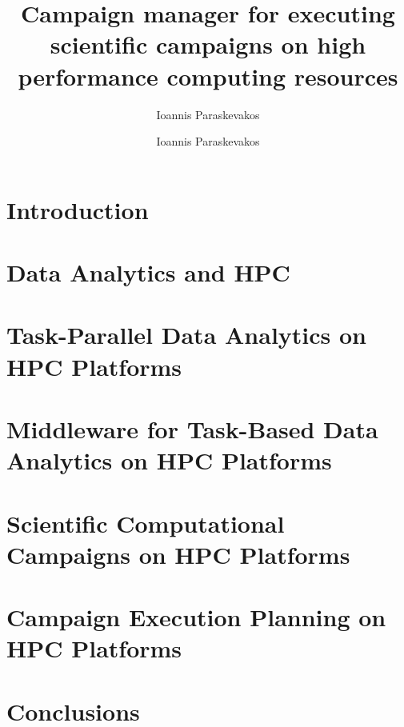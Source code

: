 \documentclass[final]{ruthesis}
\begin{document}
\author{Ioannis Paraskevakos}
\copyrightp
\title{Campaign manager for executing scientific campaigns on high performance computing resources}
\author{Ioannis Paraskevakos}					
\figurespage
\tablespage

\abstract{}
\acknowledgements{}

\beforepreface
\afterpreface

\chapter{Introduction}


\chapter{Data Analytics and HPC}


\chapter{Task-Parallel Data Analytics on HPC Platforms}


\chapter{Middleware for Task-Based Data Analytics on HPC Platforms}


\chapter{Scientific Computational Campaigns on HPC Platforms}

\chapter{Campaign Execution Planning on HPC Platforms}

\chapter{Conclusions}




\end{document}
